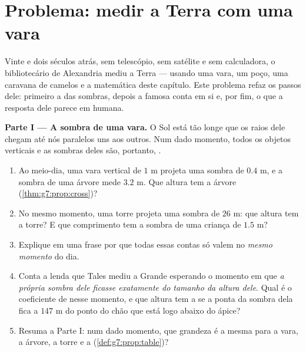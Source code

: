 \section{Problema: medir a Terra com uma vara}

\begin{problem}
\label{pb:g7:prop:1}
Vinte e dois séculos atrás, sem telescópio, sem satélite e sem
calculadora, o bibliotecário de Alexandria mediu a Terra --- usando uma
vara, um poço, uma caravana de camelos e a matemática deste capítulo.
Este problema refaz os passos dele: primeiro a  das
sombras, depois a famosa conta em si e, por fim, o que a resposta dele
parece em  humana.

\medskip
\noindent\textbf{Parte I --- A sombra de uma vara.}
O Sol está tão longe que os raios dele chegam até nós paralelos uns aos
outros. Num dado momento, todos os objetos verticais e as sombras deles
são, portanto, .
\begin{enumerate}
  \item Ao meio-dia, uma vara vertical de $1$ m projeta uma sombra de
        $0.4$ m, e a sombra de uma árvore mede $3.2$ m. Que altura tem
        a árvore (\cref{thm:g7:prop:cross})?
  \item No mesmo momento, uma torre projeta uma sombra de $26$ m: que
        altura tem a torre? E que comprimento tem a sombra de uma
        criança de $1.5$ m?
  \item Explique em uma frase por que todas essas contas só valem no
        \emph{mesmo momento} do dia.
  \item Conta a lenda que Tales mediu a Grande  esperando o
        momento em que \emph{a própria sombra dele ficasse exatamente
        do tamanho da altura dele}. Qual é o coeficiente de
         nesse momento, e que altura tem a  se
        a ponta da sombra dela fica a $147$ m do ponto do chão que está
        logo abaixo do ápice?
  \item Resuma a Parte I: num dado momento, que grandeza é a mesma para
        a vara, a árvore, a torre e a 
        (\cref{def:g7:prop:table})?
\end{enumerate}


\end{problem}
